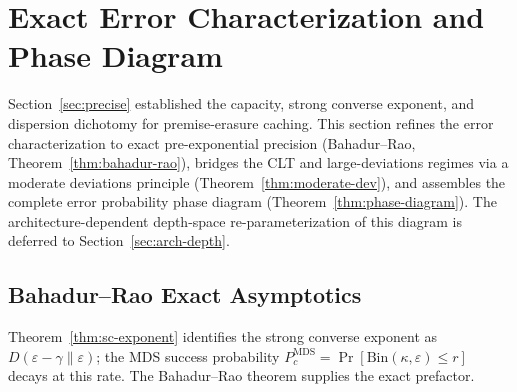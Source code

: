 \documentclass[journal]{IEEEtran}
\numberwithin{equation}{section}
\begin{document}

\section{Exact Error Characterization and Phase
  Diagram}
\label{sec:phase-diagram}

Section~\ref{sec:precise} established the capacity, strong
converse exponent, and dispersion dichotomy for premise-erasure
caching.
This section refines the error characterization to exact
pre-exponential precision (Bahadur--Rao,
Theorem~\ref{thm:bahadur-rao}), bridges the CLT and
large-deviations regimes via a moderate deviations principle
(Theorem~\ref{thm:moderate-dev}), and assembles the complete
error probability phase diagram
(Theorem~\ref{thm:phase-diagram}).
The architecture-dependent depth-space re-parameterization of
this diagram is deferred to Section~\ref{sec:arch-depth}.

\subsection{Bahadur--Rao Exact Asymptotics}
\label{subsec:bahadur-rao}

Theorem~\ref{thm:sc-exponent} identifies the strong converse
exponent as $D(\varepsilon{-}\gamma\|\varepsilon)$; the MDS
success probability
$P_c^{\mathrm{MDS}}=\Pr[\mathrm{Bin}(\kappa,\varepsilon)\le r]$
decays at this rate.
The Bahadur--Rao theorem supplies the exact prefactor.
\end{document}
